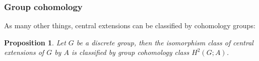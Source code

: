 \documentclass{beamer}
\newtheorem{prop}[equation]{Proposition}
\begin{document}
\begin{frame}
    \frametitle{Group cohomology}
    As many other things, central extensions can be classified by cohomology groups: \pause 
    
    \begin{prop}
        Let $G$ be a discrete group, then the isomorphism class of central extensions of $G$ by $A$ is 
        classified by group cohomology class $H^2(G; A)$.
    \end{prop}

    
\end{frame}



\end{document}
